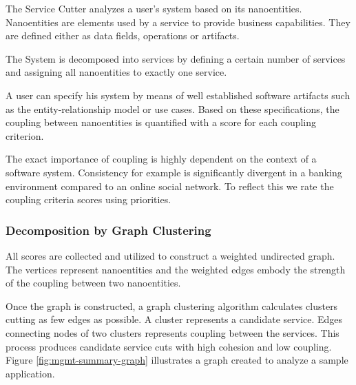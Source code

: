 The Service Cutter analyzes a user's \gls{system} based on its nanoentities. Nanoentities are elements used by a service to provide business capabilities. They are defined either as data fields, operations or artifacts. 

The System is decomposed into services by defining a certain number of services and assigning all nanoentities to exactly one service.
	
A user can specify his system by means of well established software artifacts such as the entity-relationship model or use cases. Based on these specifications, the coupling between nanoentities is quantified with a score for each coupling criterion. 

The exact importance of coupling is highly dependent on the context of a software system. Consistency for example is significantly divergent in a banking environment compared to an online social network. To reflect this we rate the coupling criteria scores using priorities.

\subsubsection{Decomposition by Graph Clustering}

All scores are collected and utilized to construct a weighted undirected graph. The vertices represent nanoentities and the weighted edges embody the strength of the coupling between two nanoentities.	

Once the graph is constructed, a graph clustering algorithm calculates clusters cutting as few edges as possible. A cluster represents a candidate service. Edges connecting nodes of two clusters represents coupling between the services. This process produces candidate service cuts with high cohesion and low coupling. Figure \ref{fig:mgmt-summary-graph} illustrates a graph created to analyze a sample application.

